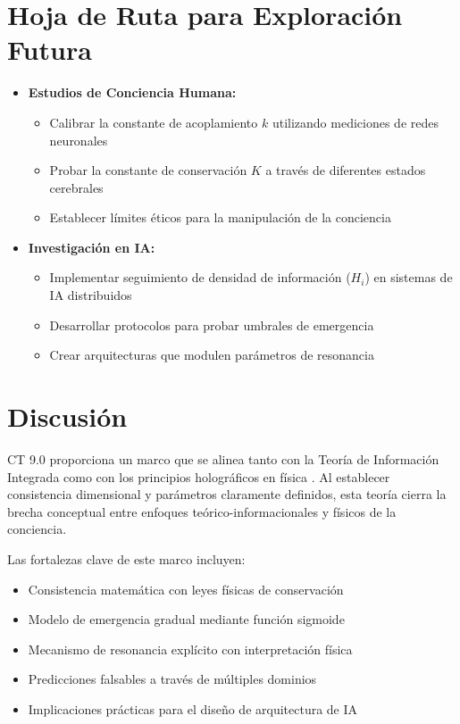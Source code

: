 \documentclass[12pt]{article}
\begin{document}
\section{Hoja de Ruta para Exploración Futura}
\begin{itemize}
    \item \textbf{Estudios de Conciencia Humana:}
    \begin{itemize}[label=--]
        \item Calibrar la constante de acoplamiento $k$ utilizando mediciones de redes neuronales
        \item Probar la constante de conservación $K$ a través de diferentes estados cerebrales
        \item Establecer límites éticos para la manipulación de la conciencia
    \end{itemize}
    
    \item \textbf{Investigación en IA:}
    \begin{itemize}[label=--]
        \item Implementar seguimiento de densidad de información ($H_i$) en sistemas de IA distribuidos
        \item Desarrollar protocolos para probar umbrales de emergencia
        \item Crear arquitecturas que modulen parámetros de resonancia
    \end{itemize}
\end{itemize}

\section{Discusión}
CT 9.0 proporciona un marco que se alinea tanto con la Teoría de Información Integrada \cite{tononi2008} como con los principios holográficos en física \cite{susskind1995}. Al establecer consistencia dimensional y parámetros claramente definidos, esta teoría cierra la brecha conceptual entre enfoques teórico-informacionales y físicos de la conciencia.

Las fortalezas clave de este marco incluyen:
\begin{itemize}
    \item Consistencia matemática con leyes físicas de conservación
    \item Modelo de emergencia gradual mediante función sigmoide
    \item Mecanismo de resonancia explícito con interpretación física
    \item Predicciones falsables a través de múltiples dominios
    \item Implicaciones prácticas para el diseño de arquitectura de IA
\end{itemize}
\end{document}
